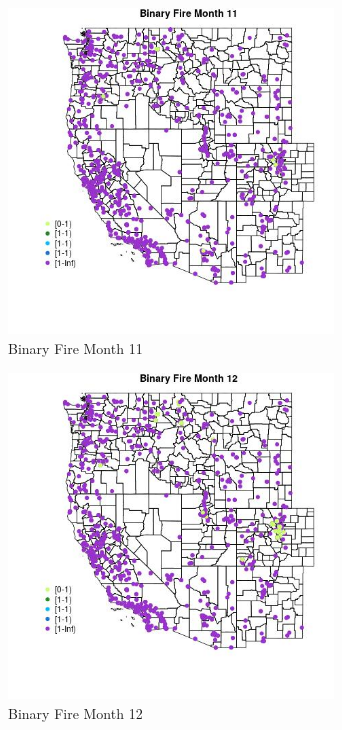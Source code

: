 \begin{figure} 
\centering  
\includegraphics[width=0.77\textwidth]{Code_Outputs/Report_ML_input_PM25_Step4_part_f_de_duplicated_aveswNAs_MapObsMo11Binary_Fire.jpg} 
\caption{\label{fig:Report_ML_input_PM25_Step4_part_f_de_duplicated_aveswNAsMapObsMo11Binary_Fire}Binary Fire Month 11} 
\end{figure} 
 

\begin{figure} 
\centering  
\includegraphics[width=0.77\textwidth]{Code_Outputs/Report_ML_input_PM25_Step4_part_f_de_duplicated_aveswNAs_MapObsMo12Binary_Fire.jpg} 
\caption{\label{fig:Report_ML_input_PM25_Step4_part_f_de_duplicated_aveswNAsMapObsMo12Binary_Fire}Binary Fire Month 12} 
\end{figure} 
 

